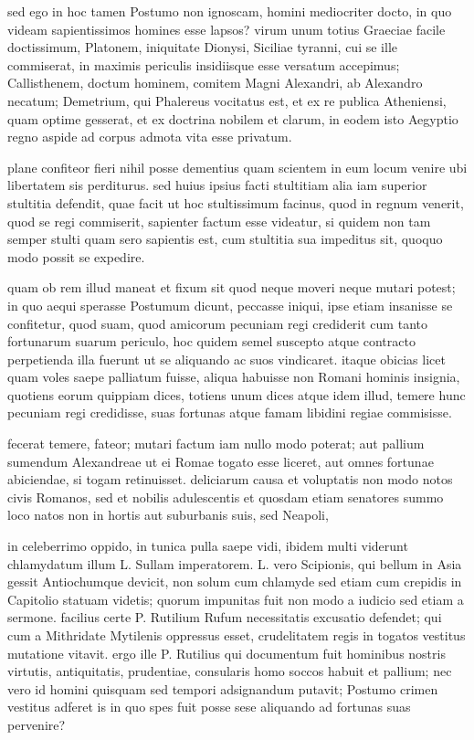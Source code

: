  sed ego in hoc tamen Postumo non ignoscam, homini mediocriter docto, in quo videam sapientissimos homines esse lapsos? virum unum totius Graeciae facile doctissimum, Platonem, iniquitate Dionysi, Siciliae tyranni, cui se ille commiserat, in maximis periculis insidiisque esse versatum accepimus; Callisthenem, doctum hominem, comitem Magni Alexandri, ab Alexandro necatum; Demetrium, qui Phalereus vocitatus est, et ex re publica Atheniensi, quam optime gesserat, et ex doctrina nobilem et clarum, in eodem isto Aegyptio regno aspide ad corpus admota vita esse privatum.

 plane confiteor fieri nihil posse dementius quam scientem in eum locum venire ubi libertatem sis perditurus. sed huius ipsius facti stultitiam alia iam superior stultitia defendit, quae facit ut hoc stultissimum facinus, quod in regnum venerit, quod se regi commiserit, sapienter factum esse videatur, si quidem non tam semper stulti quam sero sapientis est, cum stultitia sua impeditus sit, quoquo modo possit se expedire.

 quam ob rem illud maneat et fixum sit quod neque moveri neque mutari potest; in quo aequi sperasse Postumum dicunt, peccasse iniqui, ipse etiam insanisse se confitetur, quod suam, quod amicorum pecuniam regi crediderit cum tanto fortunarum suarum periculo, hoc quidem semel suscepto atque contracto perpetienda illa fuerunt ut se aliquando ac suos vindicaret. itaque obicias licet quam voles saepe palliatum fuisse, aliqua habuisse non Romani hominis insignia, quotiens eorum quippiam dices, totiens unum dices atque idem illud, temere hunc pecuniam regi credidisse, suas fortunas atque famam libidini regiae commisisse.

 fecerat temere, fateor; mutari factum iam nullo modo poterat; aut pallium sumendum Alexandreae ut ei Romae togato esse liceret, aut omnes fortunae abiciendae, si togam retinuisset. deliciarum causa et voluptatis non modo notos civis Romanos, sed et nobilis adulescentis et quosdam etiam senatores summo loco natos non in hortis aut suburbanis suis, sed Neapoli,

 in celeberrimo oppido, in tunica pulla saepe vidi, ibidem multi viderunt chlamydatum illum L. Sullam imperatorem. L. vero Scipionis, qui bellum in Asia gessit Antiochumque devicit, non solum cum chlamyde sed etiam cum crepidis in Capitolio statuam videtis; quorum impunitas fuit non modo a iudicio sed etiam a sermone. facilius certe P. Rutilium Rufum necessitatis excusatio defendet; qui cum a Mithridate Mytilenis oppressus esset, crudelitatem regis in togatos vestitus mutatione vitavit. ergo ille P. Rutilius qui documentum fuit hominibus nostris virtutis, antiquitatis, prudentiae, consularis homo soccos habuit et pallium; nec vero id homini quisquam sed tempori adsignandum putavit; Postumo crimen vestitus adferet is in quo spes fuit posse sese aliquando ad fortunas suas pervenire?


